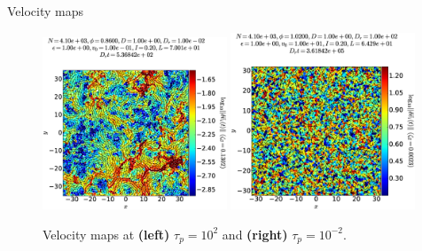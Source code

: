\documentclass{beamer}
\begin{document}
\begin{frame}{Velocity maps}

\begin{figure}
\centering
\includegraphics[width=0.49\textwidth]{No4096_Fl1000_Vl0000_Tl1000_Rj1000_Dk8600_El0000.velo.eps}
\includegraphics[width=0.49\textwidth]{No4096_Fl1000_Vl0000_Tl1000_Rn1000_Dl1020_El0000.velo.eps}
\caption{Velocity maps at {\bf (left)} $\tau_p = 10^2$ and {\bf (right)} $\tau_p = 10^{-2}$.}
\end{figure}


\end{frame}
\end{document}
